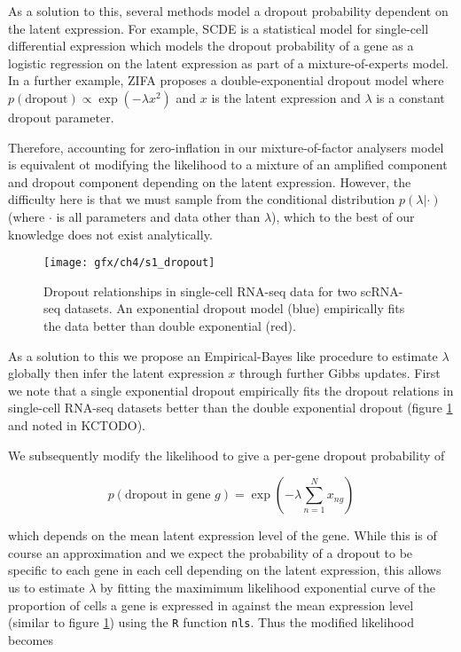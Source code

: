 As a solution to this, several methods model a dropout probability dependent on the latent expression. For example, SCDE \cite{kharchenko2014bayesian} is a statistical model for single-cell differential expression which models the dropout probability of a gene as a logistic regression on the latent expression as part of a mixture-of-experts model.
In a further example, ZIFA \cite{pierson2015zifa} proposes a double-exponential dropout model where $p(\text{dropout}) \propto \exp(-\lambda x^2)$ and $x$ is the latent expression and $\lambda$ is a constant dropout parameter.

Therefore, accounting for zero-inflation in our mixture-of-factor analysers model is equivalent ot modifying the likelihood to a mixture of an amplified component and dropout component depending on the latent expression. However, the difficulty here is that we must sample from the conditional distribution $p(\lambda | \cdot)$ (where $\cdot$ is all parameters and data other than $\lambda$), which to the best of our knowledge does not exist analytically.

\begin{figure}%
	\centering
	\texttt{[image: gfx/ch4/s1\_dropout]}
	\caption{Dropout relationships in single-cell RNA-seq data for two scRNA-seq datasets. An exponential dropout model (blue) empirically fits the data better than double exponential (red).} \label{fig:dropout}
\end{figure}

As a solution to this we propose an Empirical-Bayes like procedure to estimate $\lambda$ globally then infer the latent expression $x$ through further Gibbs updates. First we note that a single exponential dropout empirically fits the dropout relations in single-cell RNA-seq datasets better than the double exponential dropout (figure \ref{fig:dropout} and noted in KCTODO).

We subsequently modify the likelihood to give a per-gene dropout probability of

\begin{equation}
p(\text{dropout in gene $g$}) = \exp(-\lambda \sum_{n=1}^N x_{ng})
\end{equation}

 which depends on the mean latent expression level of the gene. While this is of course an approximation and we expect the probability of a dropout to be specific to each gene in each cell depending on the latent expression, this allows us to estimate $\lambda$ by fitting the maximimum likelihood exponential curve of the proportion of cells a gene is expressed in against the mean expression level (similar to figure \ref{fig:dropout}) using the \texttt{R} function \texttt{nls}. Thus the modified likelihood becomes

